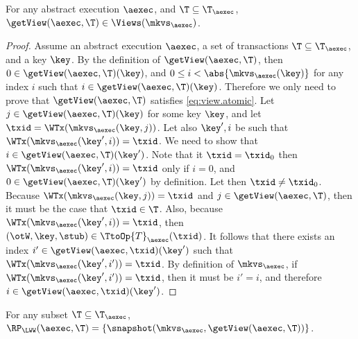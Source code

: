 \begin{proposition}
\label{prop:getview.valid}
For any abstract execution $\aexec$, and $\T \subseteq \T_{\aexec}$, 
$\getView(\aexec, \T) \in \Views(\mkvs_{\aexec})$.
\end{proposition}
\begin{proof}
Assume an abstract execution $\aexec$, a set of transactions $\T \subseteq \T_{\aexec}$, and a key \( \key \).
By the definition of $\getView(\aexec, \T)$, 
then $0 \in \getView(\aexec, \T)(\key)$, and 
$0 \leq i < \abs{ \mkvs_{\aexec}(\key) }$ for any index \( i \) such that $i \in \getView(\aexec, \T)(\key)$.
Therefore we only need to prove that $\getView(\aexec, \T)$ satisfies \eqref{eq:view.atomic}.
Let $j \in \getView(\aexec, \T)(\key)$ for some key $\key$, and let $\txid = 
\WTx(\mkvs_{\aexec}(\key, j))$. Let also $\key', i$ be such that 
$\WTx(\mkvs_{\aexec}(\key', i)) = \txid$. We need to show that 
$i \in \getView(\aexec, \T)(\key')$. Note that it $\txid = \txid_{0}$ 
then $\WTx(\mkvs_{\aexec}(\key', i)) = \txid$ only if $i = 0$, and 
$0 \in \getView(\aexec, \T)(\key')$ by definition. 
Let then $\txid \neq \txid_{0}$. Because $\WTx(\mkvs_{\aexec}(\key, j)) = \txid$ 
and $j \in \getView(\aexec, \T)$, then it must be the case that $\txid \in \T$. 
Also, because $\WTx(\mkvs_{\aexec}(\key', i)) = \txid$, then $(\otW, \key, \stub) \in 
\TtoOp{T}_{\aexec}(\txid)$. It follows that there exists an index $i' \in \getView(\aexec, \txid)(\key')$ 
such that $\WTx(\mkvs_{\aexec}(\key', i')) = \txid$. By definition of 
$\mkvs_{\aexec}$, if $\WTx(\mkvs_{\aexec}(\key', i')) = \txid$, then it must 
be $i' = i$, and therefore $i \in \getView(\aexec, \txid)(\key')$.
\end{proof}


\begin{proposition}
\label{prop:compatible.aexec2kv}
For any subset $\T \subseteq \T_{\aexec}$, $\RP_{\LWW}(\aexec, \T) = \{\snapshot(\mkvs_{\aexec}, \getView(\aexec, \T))\}$.
\end{proposition}


